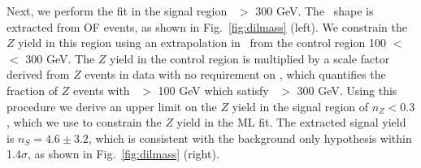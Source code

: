 Next, we perform the fit in the signal region \Ht\ $>$ 300 GeV. The \ttbar\ shape
is extracted from OF events, as shown in Fig.~\ref{fig:dilmass} (left). We
constrain the $Z$ yield in this region using an extrapolation in \Ht\ from the 
control region 100 $<$ \Ht\ $<$ 300 GeV. The $Z$ yield in the control region is
multiplied by a scale factor derived from $Z$ events in data with no requirement
on \MET, which quantifies the fraction of $Z$ events with \Ht\ $>$ 100 GeV which 
satisfy \Ht\ $>$ 300 GeV. Using this procedure we derive an upper limit on the
$Z$ yield in the signal region of $n_Z < 0.3$, which we use to constrain the
$Z$ yield in the ML fit. The extracted signal yield is $n_S = 4.6 \pm 3.2$,
which is consistent with the background only hypothesis within 1.4$\sigma$,
as shown in Fig.~\ref{fig:dilmass} (right). 





